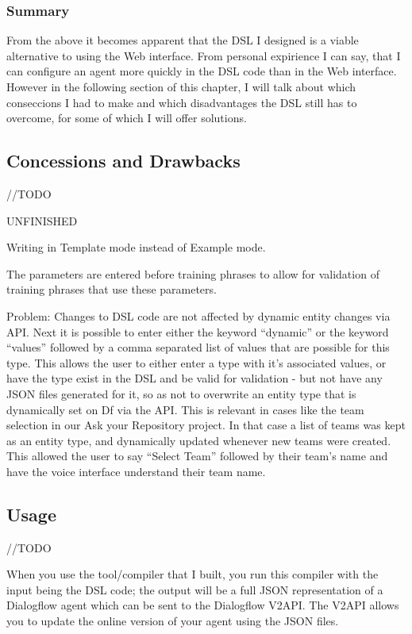 \subsubsection{Summary}
From the above it becomes apparent that the DSL I designed is a viable alternative to using the Web interface.
From personal expirience I can say, that I can configure an agent more quickly in the DSL code than in the Web interface. However in the following section of this chapter, I will talk about which conseccions I had to make and which disadvantages the DSL still has to overcome, for some of which I will offer solutions.

\subsection{Concessions and Drawbacks}
//TODO

UNFINISHED

Writing in Template mode instead of Example mode.

The parameters are entered before training phrases to allow for validation of training phrases that use these parameters.

Problem: Changes to DSL code are not affected by dynamic entity changes via API.
Next it is possible to enter either the keyword “dynamic” or the keyword “values” followed by a comma separated list of values that are possible for this type.
This allows the user to either enter a type with it’s associated values, or have the type exist in the DSL and be valid for validation - but not have any JSON files generated for it, so as not to overwrite an entity type that is dynamically set on Df via the API.
This is relevant in cases like the team selection in our Ask your Repository project.
In that case a list of teams was kept as an entity type, and dynamically updated whenever new teams were created. This allowed the user to say “Select Team” followed by their team’s name and have the voice interface understand their team name.

\subsection{Usage}
//TODO

When you use the tool/compiler that I built, you run this compiler with the input being the DSL code; the output will be a full JSON representation of a Dialogflow agent which can be sent to the Dialogflow V2API.
The V2API allows you to update the online version of your agent using the JSON files.


